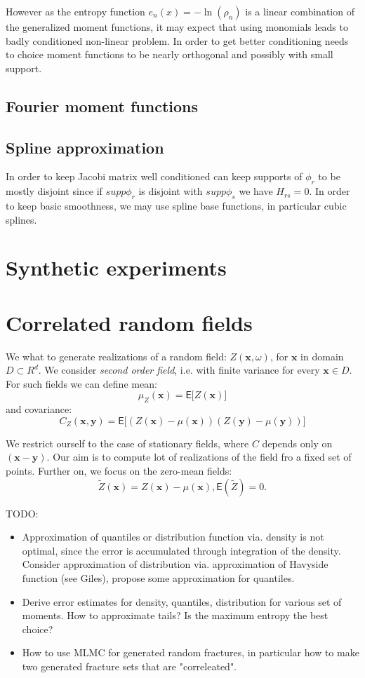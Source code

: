 \documentclass{article}
\def\vc#1{\mathbf{\boldsymbol{#1}}}     %
\def \E{{\mathsf E}}
\begin{document}
However as the entropy function $e_n(x) = -\ln(\rho_n)$ is a linear combination of the generalized moment functions, it may expect that using monomials leads to badly conditioned non-linear problem. In order to 
get better conditioning needs to choice moment functions to be nearly orthogonal and possibly with small support.

\subsection{Fourier moment functions}


\subsection{Spline approximation}
In order to keep Jacobi matrix well conditioned can keep supports of $\phi_r$ to be mostly disjoint since if $supp \phi_r$ is disjoint with $supp \phi_s$ we have $H_{rs} = 0$.
In order to keep basic smoothness, we may use spline base functions, in particular cubic splines.



\section{Synthetic experiments}
\section{Correlated random fields}
We what to generate realizations of a random field: $Z(\vc x, \omega)$, for $\vc x$ in domain $D \subset R^d$. We consider {\it second order field}, i.e. with finite variance for every $\vc x\in D$. For such fields we can define mean:
\[
    \mu_Z(\vc x) = \E\big[ Z(\vc x) \big]
\]
and covariance:
\[
    C_Z(\vc x, \vc y) = \E\big[ (Z(\vc x) - \mu(\vc x))(Z(\vc y) - \mu(\vc y)) \big]
\]

We restrict ourself to the case of stationary fields, where $C$ depends only on $(\vc x - \vc y)$. Our aim is to compute lot of realizations of the field fro a fixed set of points. Further on, we focus on the zero-mean fields:
\[
    \tilde Z(\vc x) = Z(\vc x) - \mu(\vc x), \E(\tilde Z) = 0.
\]

TODO:
\begin{itemize}
\item Approximation of quantiles or distribution function via. density is not optimal, since the error is accumulated through integration of the density. Consider approximation of distribution via. approximation of Havyside function (see Giles), propose some approximation for quantiles.

\item Derive error estimates for density, quantiles, distribution  for various set of moments. How to approximate tails? Is the maximum entropy the best choice?

\item How to use MLMC for generated random fractures, in particular how to make two generated fracture sets that are "correleated".
\end{itemize}
\end{document}
